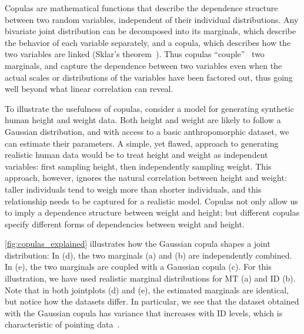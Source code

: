 \documentclass[acmlarge, manuscript,review]{acmart}
\begin{document}
Copulas are mathematical functions that describe the dependence structure between two random variables, independent of their individual distributions. Any bivariate joint distribution can be decomposed into its marginals, which describe the behavior of each variable separately, and a copula, which describes how the two variables are linked (Sklar's theorem~\cite{nelsen2006}). Thus copulas ``couple''~\cite[Chapter 1]{nelsen2006} two marginals, and capture the dependence between two variables even when the actual scales or distributions of the variables have been factored out, thus going well beyond what linear correlation can reveal.



To illustrate the usefulness of copulas, consider a model for generating synthetic human height and weight data. Both height and weight are likely to follow a Gaussian distribution, and with access to a basic anthropomorphic dataset, we can estimate their parameters. 
A simple, yet flawed, approach to generating realistic human data would be to treat height and weight as independent variables: first sampling height, then independently sampling weight. This approach, however, ignores the natural correlation between height and weight: taller individuals tend to weigh more than shorter individuals, and this relationship needs to be captured for a realistic model.
Copulas not only allow us to imply a dependence structure between weight and height; but different copulas specify different forms of dependencies between weight and height.


\autoref{fig:copulas_explained} illustrates how the Gaussian copula shapes a joint distribution: In (d), the two marginals (a) and (b) are independently combined. In (e), the two marginals are coupled with a Gaussian copula (c). For this illustration, we have used realistic marginal distributions for MT (a) and ID (b). Note that in both jointplots (d) and (e), the estimated marginals are identical, but notice how the datasets differ. In particular, we see that the dataset obtained with the Gaussian copula has variance that increases with ID levels, which is characteristic of pointing data~\cite{gori2018these}.



\end{document}
